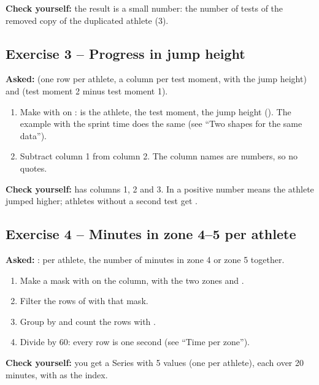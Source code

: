\documentclass[11pt,a4paper]{article}
\begin{document}
\textbf{Check yourself:} the result is a small number: the number of tests
of the removed copy of the duplicated athlete (3).

\subsection*{Exercise 3 -- Progress in jump height}

\textbf{Asked:}  (one row per athlete, a column per test
moment, with the jump height) and  (test
moment 2 minus test moment 1).

\begin{enumerate}
  \item Make  with  on
        :  is the athlete,  the
        test moment,  the jump height ().
        The example with the sprint time does the same (see ``Two shapes
        for the same data'').
  \item Subtract column 1 from column 2. The column names are numbers, so
        no quotes.
\end{enumerate}

\textbf{Check yourself:}  has columns 1, 2 and 3. In
 a positive number means the athlete jumped
higher; athletes without a second test get .

\subsection*{Exercise 4 -- Minutes in zone 4--5 per athlete}

\textbf{Asked:} : per athlete, the number of
minutes in zone 4 or zone 5 together.

\begin{enumerate}
  \item Make a mask with  on the 
        column, with the two zones  and .
  \item Filter the rows of  with that mask.
  \item Group by  and count the rows with .
  \item Divide by 60: every row is one second (see ``Time per zone'').
\end{enumerate}

\textbf{Check yourself:} you get a Series with 5 values (one per athlete),
each over 20 minutes, with  as the index.
\end{document}
